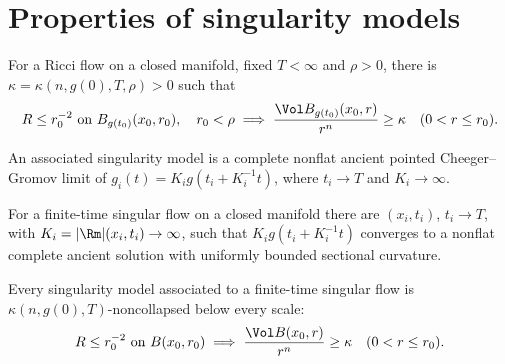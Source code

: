 \section{Properties of singularity models}

\begin{theorem}
\label{thm:chow-iv-no-local-collapsing}
For a Ricci flow on a closed manifold, fixed \(T<\infty\) and \(\rho>0\),
there is \(\kappa=\kappa(n,g(0),T,\rho)>0\) such that
\[
R\le r_0^{-2}\text{ on }B_{g(t_0)}(x_0,r_0),\quad r_0<\rho
\implies
\frac{\Vol B_{g(t_0)}(x_0,r)}{r^n}\ge\kappa\quad(0<r\le r_0).
\]
\end{theorem}

\begin{definition}
\label{def:chow-iv-finite-time-singularity-model}
An associated singularity model is a complete nonflat ancient pointed
Cheeger--Gromov limit of \(g_i(t)=K_i g(t_i+K_i^{-1}t)\), where
\(t_i\to T\) and \(K_i\to\infty\).
\end{definition}

\begin{theorem}
\label{thm:chow-iv-existence-singularity-models}
For a finite-time singular flow on a closed manifold there are
\((x_i,t_i)\), \(t_i\to T\), with \(K_i=|\Rm|(x_i,t_i)\to\infty\), such that
\(K_i g(t_i+K_i^{-1}t)\) converges to a nonflat complete ancient solution
with uniformly bounded sectional curvature.
\end{theorem}

\begin{theorem}
\label{thm:chow-iv-singularity-models-noncollapsed}
Every singularity model associated to a finite-time singular flow is
\(\kappa(n,g(0),T)\)-noncollapsed below every scale:
\[
R\le r_0^{-2}\text{ on }B(x_0,r_0)\implies
\frac{\Vol B(x_0,r)}{r^n}\ge\kappa\quad(0<r\le r_0).
\]
\end{theorem}

